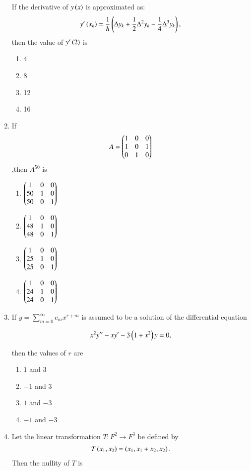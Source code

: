 \documentclass[journal]{IEEEtran}
\begin{document}
\begin{enumerate}
If the derivative of $y \left(x\right)$ is approximated as:
\begin{align*}
y^\prime \left(x_k\right) = \frac{1}{h} \left( \Delta y_k + \frac{1}{2} \Delta^2 y_k - \frac{1}{4} \Delta^3 y_k \right),
\end{align*}
then the value of $y^\prime \left(2\right)$ is

\begin{enumerate}
    \item 4
    \item 8
    \item 12
    \item 16
\end{enumerate}

\item If 
\begin{align*}
	A = \begin{pmatrix}
        1 & 0 & 0 \\
        1 & 0 & 1 \\
	0 & 1 & 0\end{pmatrix}
\end{align*}
,then $A^{50}$ is

\begin{enumerate}
\item $\begin{pmatrix} 1 & 0 & 0 \\ 50 & 1 & 0 \\ 50 & 0 & 1 \end{pmatrix}$
\item $\begin{pmatrix} 1 & 0 & 0 \\ 48 & 1 & 0 \\ 48 & 0 & 1 \end{pmatrix}$
\item $\begin{pmatrix} 1 & 0 & 0 \\ 25 & 1 & 0 \\ 25 & 0 & 1 \end{pmatrix}$
\item $\begin{pmatrix} 1 & 0 & 0 \\ 24 & 1 & 0 \\ 24 & 0 & 1 \end{pmatrix}$
\end{enumerate}
\item If $y = \sum_{m=0}^{\infty} c_m x^{r+m}$ is assumed to be a solution of the differential equation

	\begin{align*}
		x^2 y^{\prime \prime} - xy^{\prime} - 3 \left(1 + x^2\right) y = 0,
	\end{align*}

then the values of $r$ are
\begin{enumerate}
    \item $1$ and $3$
    \item $-1$ and $3$
    \item $1$ and $-3$
    \item $-1$ and $-3$
\end{enumerate}
\item Let the linear transformation $T : F^2 \rightarrow F^3$ be defined by
\begin{align*}
T \left(x_1, x_2\right) = \left(x_1, x_1 + x_2, x_2\right).
\end{align*}
Then the nullity of $T$ is


\end{enumerate}
\end{document}
